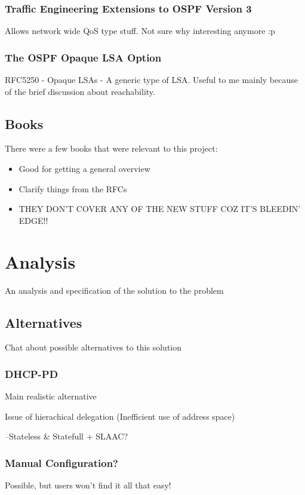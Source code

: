 \documentclass[12pt]{report}
\begin{document}
\subsection{Traffic Engineering Extensions to OSPF Version 3}
Allows network wide QoS type stuff. Not sure why interesting anymore :p

\subsection{The OSPF Opaque LSA Option}
RFC5250 - Opaque LSAs - A generic type of LSA. Useful to me mainly because of
the brief discussion about reachability.

\section{Books}
There were a few books that were relevant to this project: 
\begin{itemize}
\item Good for getting a general overview
\item Clarify things from the RFCs 
\item THEY DON'T COVER ANY OF THE NEW STUFF COZ IT'S BLEEDIN' EDGE!!
\end{itemize}

\chapter{Analysis}
An analysis and specification of the solution to the problem

\section{Alternatives}
Chat about possible alternatives to this solution

\subsection{DHCP-PD}
Main realistic alternative

Issue of hierachical delegation (Inefficient use of address space)

--Stateless \& Statefull + SLAAC?

\subsection{Manual Configuration?}
Possible, but users won't find it all that easy!
\end{document}
